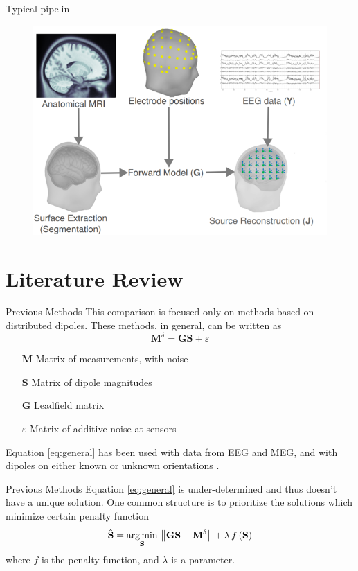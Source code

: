 \documentclass[progressbar=head]{beamer}
\begin{document}
\begin{frame}{Typical pipelin}
\begin{figure}
\centering
\includegraphics[width=0.7\linewidth]{./img_dev/pipeline}
\end{figure}
\end{frame}


{
\section{Literature Review}
}

\begin{frame}{Previous Methods}
This comparison is focused only on methods based on distributed dipoles. These methods, in general, can be written as
\begin{equation}
    \mathbf{M}^\delta = \mathbf{G} \mathbf{S} + \varepsilon
    \label{eq:general}
\end{equation}
\begin{itemize}
    \item[$\mathbf{M}$] Matrix of measurements, with noise
    \item[$\mathbf{S}$] Matrix of dipole magnitudes
    \item[$\mathbf{G}$] Leadfield matrix
    \item[$\varepsilon$] Matrix of additive noise at sensors
\end{itemize}

Equation \eqref{eq:general} has been used with %
data from EEG and MEG, and with 
dipoles on either known or unknown orientations
\cite{grech2008review}.

\end{frame}

\begin{frame}{Previous Methods}
Equation \eqref{eq:general} is under-determined and thus doesn't have a unique solution. One common structure is to prioritize the solutions which minimize certain penalty function
\begin{equation}
    \hat{\mathbf{S}} = \operatorname*{arg\,min}_{\mathbf{S}}\, \left\lVert \mathbf{G} \mathbf{S}-\mathbf{M}^\delta \right\rVert + \lambda\, f\left( \mathbf{S} \right)
    \label{eq:general_min}
\end{equation}
where $f$ is the penalty function, and $\lambda$ is a parameter.

\end{frame}
\end{document}
